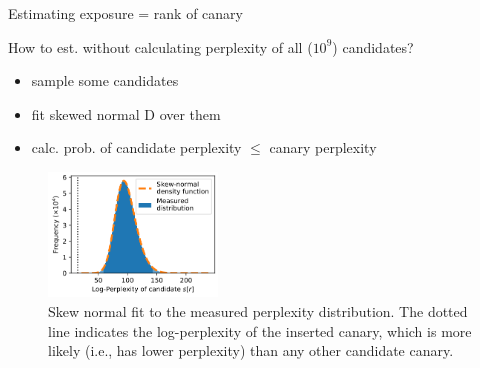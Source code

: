 \documentclass{beamer}
\begin{document}
\begin{frame}{Estimating exposure = rank of canary}

How to est. without calculating perplexity of all ($10^9$) candidates?
\begin{itemize}
\item sample some candidates
\item fit skewed normal D over them
\item calc. prob. of candidate perplexity $\leq$ canary perplexity
\end{itemize}

\begin{figure}[h]
\includegraphics[width=0.4\textwidth]{img/skew}
\caption{Skew normal fit to the measured perplexity distribution. The dotted line indicates the log-perplexity of the inserted canary, which is more likely (i.e., has lower perplexity) than any other candidate canary.}
\end{figure}

\end{frame}
\end{document}

